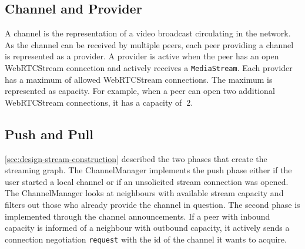 \subsection{Channel and Provider}
A channel is the representation of a video broadcast circulating in the network. As the channel can be received by multiple peers, each peer providing a channel is represented as a provider. A provider is active when the peer has an open WebRTCStream connection and actively receives a \lstinline|MediaStream|. Each provider has a maximum of allowed WebRTCStream connections. The maximum is represented as capacity. For example, when a peer can open two additional WebRTCStream connections, it has a capacity of $\ 2 $.

\subsection{Push and Pull}
\vref{sec:design-stream-construction} described the two phases that create the streaming graph. The ChannelManager implements the push phase either if the user started a local channel or if an unsolicited stream connection was opened. The ChannelManager looks at neighbours with available stream capacity and filters out those who already provide the channel in question.
The second phase is implemented through the channel announcements. If a peer with inbound capacity is informed of a neighbour with outbound capacity, it actively sends a connection negotiation \lstinline|request| with the id of the channel it wants to acquire.
